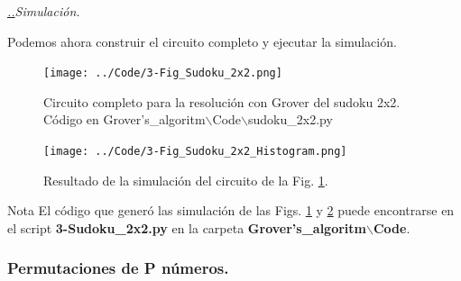 \documentclass[a4paper,11pt]{article} %
\numberwithin{equation}{section}
\newcounter{subsubsubsection}[subsubsection]
\def\subsubii{\par\addtocounter{subsubsubsection}{1}\underline{\it 
\thesubsubsection.\thesubsubsubsection.}\hskip0.5cm}
\begin{document}
			\subsubii \textit{Simulación.}
			
Podemos ahora construir el circuito completo y ejecutar la simulación. 

	\begin{figure}[H]
	\centering 
	\texttt{[image: ../Code/3-Fig\_Sudoku\_2x2.png]}
	\caption{Circuito completo para la resolución con Grover del sudoku 2x2. Código en 
	Grover's\_algoritm$\backslash$Code$\backslash$sudoku\_2x2.py}
	\label{Fig_Imple_Sudoku_2x2}
	\end{figure}
	
	\begin{figure}[H]
	\centering 
	\texttt{[image: ../Code/3-Fig\_Sudoku\_2x2\_Histogram.png]}
	\caption{Resultado de la simulación del circuito de la Fig. \ref{Fig_Imple_Sudoku_2x2}.}
	\label{Fig_Imple_Oracle_Sudoku_2x2_Histogram}
	\end{figure}

	\begin{mybox}{Nota}
	El código que generó las simulación de las Figs. \ref{Fig_Imple_Sudoku_2x2} y 
	\ref{Fig_Imple_Oracle_Sudoku_2x2_Histogram} puede encontrarse en el script	
	\textbf{3-Sudoku\_2x2.py} en la carpeta \textbf{Grover's\_algoritm$\backslash$Code}.
	\end{mybox}


\subsubsection{Permutaciones de P números.}
\end{document}
